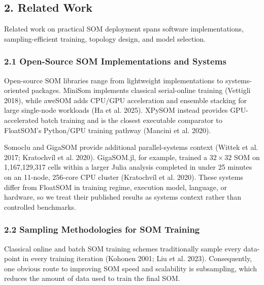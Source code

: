 \documentclass[
]{article}
\providecommand{\DIFadd}[1]{{\protect\color{blue} #1}} %
\providecommand{\DIFaddbegin}{} %
\providecommand{\DIFaddend}{} %
\begin{document}
\subsection{2. Related Work}\label{related-work}

Related work on practical SOM deployment spans software implementations,
sampling-efficient training, topology design, and model selection.

\subsubsection{2.1 Open-Source SOM Implementations and
Systems}\label{open-source-som-implementations-and-systems}

 \DIFaddbegin \DIFadd{Open-source }\DIFaddend SOM libraries range from lightweight  \DIFaddbegin \DIFadd{implementations to
systems-oriented packages. MiniSom implements classical serial-online
training }\DIFaddend (Vettigli 2018),  \DIFaddbegin \DIFadd{while aweSOM adds CPU/GPU acceleration and
ensemble stacking for large single-node workloads (Ha et al. 2025).
XPySOM instead provides GPU-accelerated batch training and is the
closest executable comparator to FloatSOM's Python/GPU training pathway
}\DIFaddend (Mancini et al. 2020).
 \DIFaddbegin

\DIFaddend Somoclu and GigaSOM provide  \DIFaddbegin \DIFadd{additional parallel-systems context }\DIFaddend (Wittek
et al. 2017; Kratochvíl et al. 2020).  \DIFaddbegin \DIFadd{GigaSOM.jl, for example, trained a
\(32 \times 32\) SOM on 1,167,129,317 cells within a larger Julia
analysis completed in under 25 minutes on an 11-node, 256-core CPU
cluster (Kratochvíl et al. 2020). These systems differ from FloatSOM in
training regime, execution model, language, or hardware, so we treat
their published results as systems context rather than controlled
benchmarks.
}\DIFaddend

\subsubsection{2.2 Sampling Methodologies for SOM
Training}\label{sampling-methodologies-for-som-training}

Classical online and batch SOM training schemes traditionally sample
every data-point in every training iteration (Kohonen 2001; Liu et al.
2023). Consequently, one obvious route to improving SOM speed and
scalability is subsampling, which reduces the amount of data used to
train the final SOM.
\end{document}
